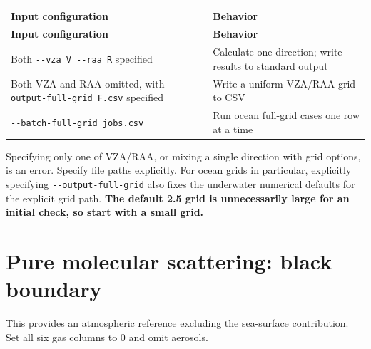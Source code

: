 {\TableFont
\begin{longtable}{@{}>{\raggedright\arraybackslash}p{}>{\raggedright\arraybackslash}p{}@{}}
\toprule
\textbf{Input configuration} & \textbf{Behavior} \\
\midrule
\endfirsthead
\toprule
\textbf{Input configuration} & \textbf{Behavior} \\
\midrule
\endhead
\bottomrule
\endfoot
Both \texttt{-\allowbreak{}-\allowbreak{}vza V -\allowbreak{}-\allowbreak{}raa R} specified & Calculate one direction; write results to standard output \\
Both VZA and RAA omitted, with \texttt{-\allowbreak{}-\allowbreak{}output-\allowbreak{}full-\allowbreak{}grid F.\allowbreak{}csv} specified & Write a uniform VZA/RAA grid to CSV \\
\texttt{-\allowbreak{}-\allowbreak{}batch-\allowbreak{}full-\allowbreak{}grid jobs.\allowbreak{}csv} & Run ocean full-grid cases one row at a time \\
\end{longtable}
}

Specifying only one of VZA/RAA, or mixing a single direction with grid options, is an error. Specify file paths explicitly. For ocean grids in particular, explicitly specifying \texttt{-\allowbreak{}-\allowbreak{}output-\allowbreak{}full-\allowbreak{}grid} also fixes the underwater numerical defaults for the explicit grid path. \textbf{The default 2.5\textdegree{} grid is unnecessarily large for an initial check, so start with a small grid.}

\section{Pure molecular scattering: black boundary}
\label{sec:auto:04_examples:2}
This provides an atmospheric reference excluding the sea-surface contribution. Set all six gas columns to 0 and omit aerosols.


\par\noindent\begin{minipage}{\linewidth}
\end{minipage}\par

